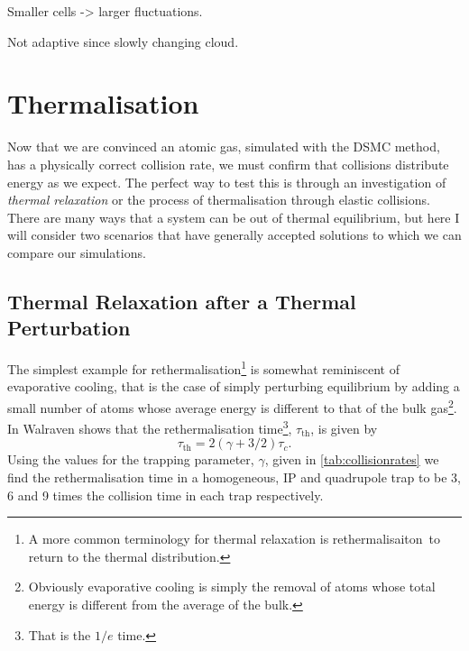Smaller cells -> larger fluctuations.

Not adaptive since slowly changing cloud.



\section{Thermalisation} 

Now that we are convinced an atomic gas, simulated with the DSMC method, has a physically correct collision rate, we must confirm that collisions distribute energy as we expect.
The perfect way to test this is through an investigation of \emph{thermal relaxation} or the process of thermalisation through elastic collisions.
There are many ways that a system can be out of thermal equilibrium, but here I will consider two scenarios that have generally accepted solutions to which we can compare our simulations.

\subsection{Thermal Relaxation after a Thermal Perturbation} \label{sec:walravenTherm}

The simplest example for rethermalisation\footnote{A more common terminology for thermal relaxation is rethermalisaiton \ie\,to return to the thermal distribution.} is somewhat reminiscent of evaporative cooling, that is the case of simply perturbing equilibrium by adding a small number of atoms whose average energy is different to that of the bulk gas\footnote{Obviously evaporative cooling is simply the removal of atoms whose total energy is different from the average of the bulk.}.
In \cite{Walraven2010} Walraven shows that the rethermalisation time\footnote{That is the $1/e$ time.}, $\tau_\mathrm{th}$, is given by
\begin{equation}
    \tau_\mathrm{th} = 2\left(\gamma + 3/2\right)\tau_{c}. \label{eq:walravenRetherm}
\end{equation}
Using the values for the trapping parameter, $\gamma$, given in \autoref{tab:collisionrates} we find the rethermalisation time in a homogeneous, IP and quadrupole trap to be 3, 6 and 9 times the collision time in each trap respectively.


